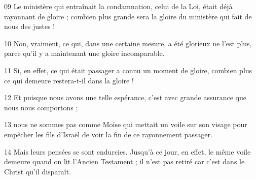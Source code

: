 
09 Le ministère qui entraînait la condamnation, celui de la Loi, était déjà rayonnant de gloire ; combien plus grande sera la gloire du ministère qui fait de nous des justes !

10 Non, vraiment, ce qui, dans une certaine mesure, a été glorieux ne l’est plus, parce qu’il y a maintenant une gloire incomparable.

11 Si, en effet, ce qui était passager a connu un moment de gloire, combien plus ce qui demeure restera-t-il dans la gloire !

12 Et puisque nous avons une telle espérance, c’est avec grande assurance que nous nous comportons ;

13 nous ne sommes pas comme Moïse qui mettait un voile sur son visage pour empêcher les fils d’Israël de voir la fin de ce rayonnement passager.

14 Mais leurs pensées se sont endurcies. Jusqu’à ce jour, en effet, le même voile demeure quand on lit l’Ancien Testament ; il n’est pas retiré car c’est dans le Christ qu’il disparaît.